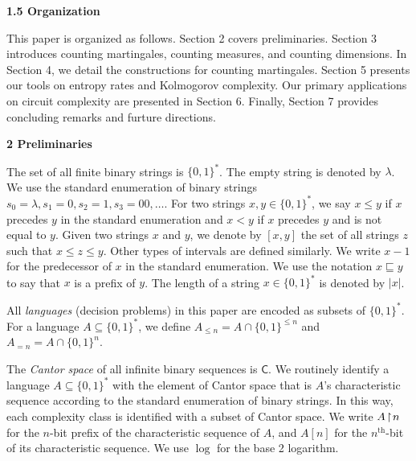 \par\medskip\noindent\textbf{
1.5 Organization}\par




This paper is organized as follows. Section 2 covers preliminaries. Section 3 introduces counting martingales, counting measures, and counting dimensions. In Section 4, we detail the constructions for counting martingales. Section 5 presents our tools on entropy rates and Kolmogorov complexity. Our primary applications on circuit complexity are presented in Section 6. Finally, Section 7 provides concluding remarks and furture directions.\par






\par\medskip\noindent\textbf{
2 Preliminaries}\par




The set of all finite binary strings is $\{0,1\}^{*}$. The empty string
is denoted by $\lambda$. We use the standard enumeration of binary
strings $s_{0}=\lambda,s_{1}=0,s_{2}=1,s_{3}=00,\ldots$. For two
strings $x,y\in\{0,1\}^{*}$, we say $x\leq y$ if $x$ precedes $y$ in
the standard enumeration and $x<y$ if $x$ precedes $y$ and is not
equal to $y$. Given two strings $x$ and $y$, we denote by $[x,y]$ the set of all strings $z$ such that $x\leq z\leq y$. Other types of intervals are defined similarly.
We write $x-1$ for the predecessor
of $x$ in the standard enumeration. We use the notation $x\sqsubseteq y$ to say that
$x$ is a prefix of $y$. The length of a string $x\in\{0,1\}^{*}$ is
denoted by $|x|$.\par




All \emph{languages} (decision problems) in this paper are encoded as
subsets of $\{0,1\}^{*}$. For a language $A\subseteq\{0,1\}^{*}$, we
define $A_{\leq n}=A\cap\{0,1\}^{\leq n}$ and $A_{=n}=A\cap\{0,1\}^{n}$.\par




The \emph{Cantor space} of all infinite binary sequences is $\mathsf{C}$. We
routinely identify a language $A\subseteq\{0,1\}^{*}$ with the element of Cantor space that is $A$’s characteristic sequence according to the
standard enumeration of binary strings. In this way, each complexity
class is identified with a subset of Cantor space. We write $A\negthinspace\upharpoonright\negthinspace n$ for the $n$-bit prefix of the characteristic sequence of $A$, and
$A[n]$ for the $n^{\mathrm{th}}$-bit of its characteristic sequence.
We use $\log$ for the base 2 logarithm.\par




